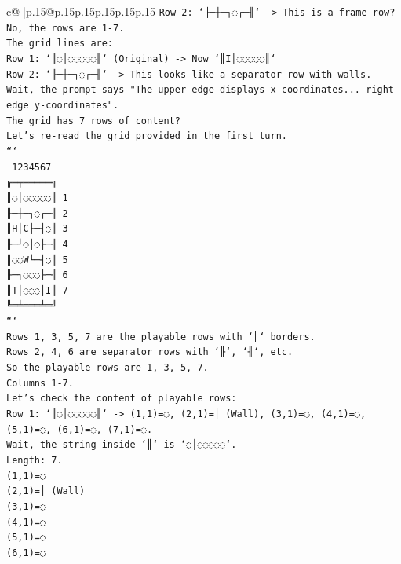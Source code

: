 \documentclass{article}
\begin{document}
{\begin{supertabular}{c@{$\;$}|p{.15\linewidth}@{}p{.15\linewidth}p{.15\linewidth}p{.15\linewidth}p{.15\linewidth}p{.15\linewidth}}
{{{\texttt{Row 2: `╟─┼─┐◌┌─╢` {-}> This is a frame row? No, the rows are 1{-}7.} \\
\texttt{The grid lines are:} \\
\texttt{Row 1: `║◌│◌◌◌◌◌║` (Original) {-}> Now `║I│◌◌◌◌◌║`} \\
\texttt{Row 2: `╟─┼─┐◌┌─╢` {-}> This looks like a separator row with walls.} \\
\texttt{Wait, the prompt says "The upper edge displays x{-}coordinates... right edge y{-}coordinates".} \\
\texttt{The grid has 7 rows of content?} \\
\texttt{Let's re{-}read the grid provided in the first turn.} \\
\texttt{```} \\
\texttt{ 1234567} \\
\texttt{╔═╤═════╗} \\
\texttt{║◌│◌◌◌◌◌║ 1} \\
\texttt{╟─┼─┐◌┌─╢ 2} \\
\texttt{║H│C├─┤◌║ 3} \\
\texttt{╟─┘◌│◌├─╢ 4} \\
\texttt{║◌◌W└─┤◌║ 5} \\
\texttt{╟─┐◌◌◌├─╢ 6} \\
\texttt{║T│◌◌◌│I║ 7} \\
\texttt{╚═╧═══╧═╝} \\
\texttt{```} \\
\texttt{Rows 1, 3, 5, 7 are the playable rows with `║` borders.} \\
\texttt{Rows 2, 4, 6 are separator rows with `╟`, `╢`, etc.} \\
\texttt{So the playable rows are 1, 3, 5, 7.} \\
\texttt{Columns 1{-}7.} \\
\texttt{Let's check the content of playable rows:} \\
\texttt{Row 1: `║◌│◌◌◌◌◌║` {-}> (1,1)=◌, (2,1)=│ (Wall), (3,1)=◌, (4,1)=◌, (5,1)=◌, (6,1)=◌, (7,1)=◌.} \\
\texttt{Wait, the string inside `║` is `◌│◌◌◌◌◌`.} \\
\texttt{Length: 7.} \\
\texttt{(1,1)=◌} \\
\texttt{(2,1)=│ (Wall)} \\
\texttt{(3,1)=◌} \\
\texttt{(4,1)=◌} \\
\texttt{(5,1)=◌} \\
\texttt{(6,1)=◌} \\
}}}
\end{supertabular}}
\end{document}
